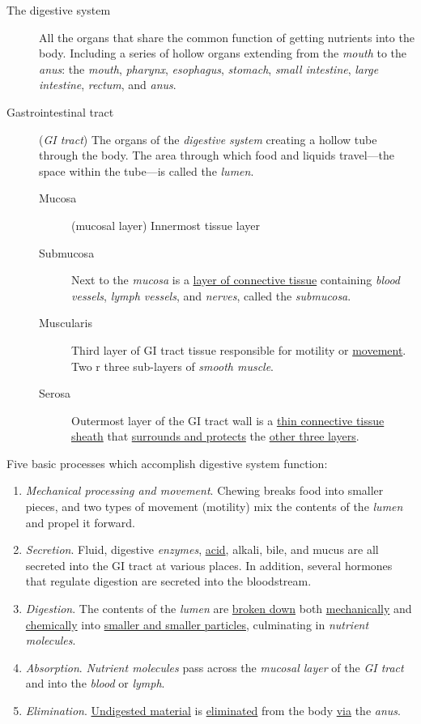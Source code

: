 \documentclass[11pt]{article}
\begin{document}
\begin{description}
\item[{The digestive system}] All the organs that share the common function of
getting nutrients into the body. Including a series of hollow organs
extending from the \emph{mouth} to the \emph{anus}: the \emph{mouth}, \emph{pharynx}, \emph{esophagus},
\emph{stomach}, \emph{small intestine}, \emph{large intestine}, \emph{rectum}, and \emph{anus}.
\item[{Gastrointestinal tract}] (\emph{GI tract}) The organs of the \emph{digestive system}
creating a hollow tube through the body. The area through which food and
liquids travel---the space within the tube---is called the \emph{lumen}.
\begin{description}
\item[{Mucosa}] (mucosal layer) Innermost tissue layer
\item[{Submucosa}] Next to the \emph{mucosa} is a \uline{layer of connective tissue} containing
\emph{blood vessels}, \emph{lymph vessels}, and \emph{nerves}, called the \emph{submucosa}.
\item[{Muscularis}] Third layer of GI tract tissue responsible for motility or
\uline{movement}. Two r three sub-layers of \emph{smooth muscle}.
\item[{Serosa}] Outermost layer of the GI tract wall is a \uline{thin connective tissue
sheath} that \uline{surrounds and protects} the \uline{other three layers}.
\end{description}
\end{description}


Five basic processes which accomplish digestive system function:
\begin{enumerate}
\item \emph{Mechanical processing and movement}. Chewing breaks food into smaller pieces,
and two types of movement (motility) mix the contents of the \emph{lumen} and
propel it forward.
\item \emph{Secretion}. Fluid, digestive \emph{enzymes}, \uline{acid}, alkali, bile, and mucus are all
secreted into the GI tract at various places. In addition, several hormones
that regulate digestion are secreted into the bloodstream.
\item \emph{Digestion}. The contents of the \emph{lumen} are \uline{broken down} both \uline{mechanically} and
\uline{chemically} into \uline{smaller and smaller particles}, culminating in \emph{nutrient
molecules}.
\item \emph{Absorption}. \emph{Nutrient molecules} pass across the \emph{mucosal layer} of the \emph{GI tract}
and into the \emph{blood} or \emph{lymph}.
\item \emph{Elimination}. \uline{Undigested material} is \uline{eliminated} from the body \uline{via} the \emph{anus}.
\end{enumerate}
\end{document}
